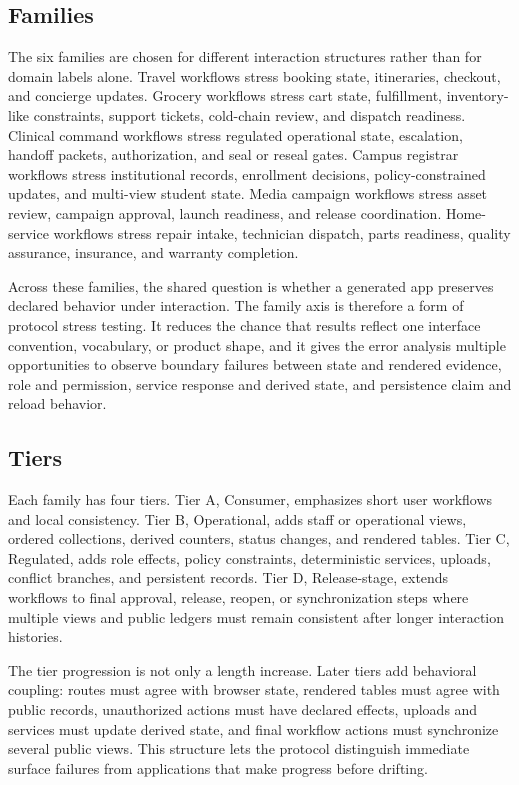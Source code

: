 \subsection{Families}
\label{sec:families}

The six families are chosen for different interaction structures rather than
for domain labels alone. Travel workflows stress booking state, itineraries,
checkout, and concierge updates. Grocery workflows stress cart state,
fulfillment, inventory-like constraints, support tickets, cold-chain review,
and dispatch readiness. Clinical command workflows stress regulated operational
state, escalation, handoff packets, authorization, and seal or reseal gates.
Campus registrar workflows stress institutional records, enrollment decisions,
policy-constrained updates, and multi-view student state. Media campaign
workflows stress asset review, campaign approval, launch readiness, and release
coordination. Home-service workflows stress repair intake, technician dispatch,
parts readiness, quality assurance, insurance, and warranty completion.

Across these families, the shared question is whether a generated app preserves
declared behavior under interaction. The family axis is therefore a form of
protocol stress testing. It reduces the chance that results reflect one
interface convention, vocabulary, or product shape, and it gives the error
analysis multiple opportunities to observe boundary failures between state and
rendered evidence, role and permission, service response and derived state, and
persistence claim and reload behavior.

\subsection{Tiers}
\label{sec:tiers}

Each family has four tiers. Tier A, Consumer, emphasizes short user workflows
and local consistency. Tier B, Operational, adds staff or operational views,
ordered collections, derived counters, status changes, and rendered tables.
Tier C, Regulated, adds role effects, policy constraints, deterministic
services, uploads, conflict branches, and persistent records. Tier D,
Release-stage, extends workflows to final approval, release, reopen, or
synchronization steps where multiple views and public ledgers must remain
consistent after longer interaction histories.

The tier progression is not only a length increase. Later tiers add behavioral
coupling: routes must agree with browser state, rendered tables must agree with
public records, unauthorized actions must have declared effects, uploads and
services must update derived state, and final workflow actions must synchronize
several public views. This structure lets the protocol distinguish immediate
surface failures from applications that make progress before drifting.

